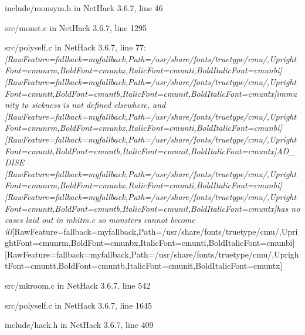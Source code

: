 \begin{myenumerate}
\item{} include/monsym.h in NetHack 3.6.7, line 46\footnotemark[154]
     

\item{} src/monst.c in NetHack 3.6.7, line 1295\footnotemark[155]
     

\item{} src/polyself.c in NetHack 3.6.7, line 77\footnotemark[156]: {\itshape \allowbreak{}\setmainfont{cmunti.ttf}[RawFeature={fallback=myfallback},Path=/usr/share/fonts/truetype/cmu/,UprightFont=cmunrm,BoldFont=cmunbx,ItalicFont=cmunti,BoldItalicFont=cmunbi]\setmonofont{cmunti.ttf}[RawFeature={fallback=myfallback},Path=/usr/share/fonts/truetype/cmu/,UprightFont=cmuntt,BoldFont=cmuntb,ItalicFont=cmunit,BoldItalicFont=cmuntx]\itshape immunity to sickness is not defined elsewhere, and {\ttfamily \allowbreak{}\setmainfont{cmunit.ttf}[RawFeature={fallback=myfallback},Path=/usr/share/fonts/truetype/cmu/,UprightFont=cmunrm,BoldFont=cmunbx,ItalicFont=cmunti,BoldItalicFont=cmunbi]\setmonofont{cmunit.ttf}[RawFeature={fallback=myfallback},Path=/usr/share/fonts/truetype/cmu/,UprightFont=cmuntt,BoldFont=cmuntb,ItalicFont=cmunit,BoldItalicFont=cmuntx]\ttfamily \itshape AD\_DISE}{$\text{ }$}\allowbreak{}\setmainfont{cmunti.ttf}[RawFeature={fallback=myfallback},Path=/usr/share/fonts/truetype/cmu/,UprightFont=cmunrm,BoldFont=cmunbx,ItalicFont=cmunti,BoldItalicFont=cmunbi]\setmonofont{cmunti.ttf}[RawFeature={fallback=myfallback},Path=/usr/share/fonts/truetype/cmu/,UprightFont=cmuntt,BoldFont=cmuntb,ItalicFont=cmunit,BoldItalicFont=cmuntx]\itshape  has no cases laid out in mhitm.c so monsters cannot become ill}\allowbreak{}\setmainfont{cmunrm.ttf}[RawFeature={fallback=myfallback},Path=/usr/share/fonts/truetype/cmu/,UprightFont=cmunrm,BoldFont=cmunbx,ItalicFont=cmunti,BoldItalicFont=cmunbi]\setmonofont{cmunrm.ttf}[RawFeature={fallback=myfallback},Path=/usr/share/fonts/truetype/cmu/,UprightFont=cmuntt,BoldFont=cmuntb,ItalicFont=cmunit,BoldItalicFont=cmuntx]
     

\item{} src/mkroom.c in NetHack 3.6.7, line 542\footnotemark[157]
     

\item{} src/polyself.c in NetHack 3.6.7, line 1645\footnotemark[158]
     

\item{} include/hack.h in NetHack 3.6.7, line 409\footnotemark[159]
\end{myenumerate}
